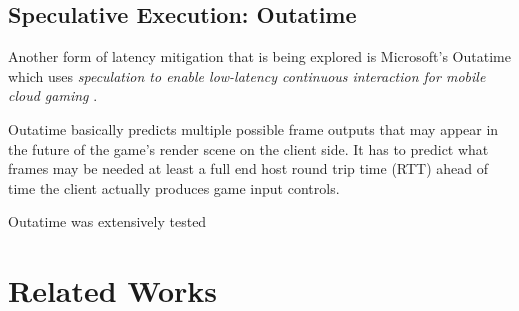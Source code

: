 \subsection{Speculative Execution: Outatime}
Another form of latency mitigation that is being explored is Microsoft's Outatime which uses \textit{speculation to enable low-latency continuous interaction for mobile cloud gaming} \cite{lee2015outatime}.
\newline 
\par
Outatime basically predicts multiple possible frame outputs that may appear in the future of the game's render scene on the client side. It has to predict what frames may be needed at least a full end host round trip time (RTT) ahead of time the client actually produces game input controls.
\newline
\par
Outatime was extensively tested

\section{Related Works}
\lipsum[1-1]